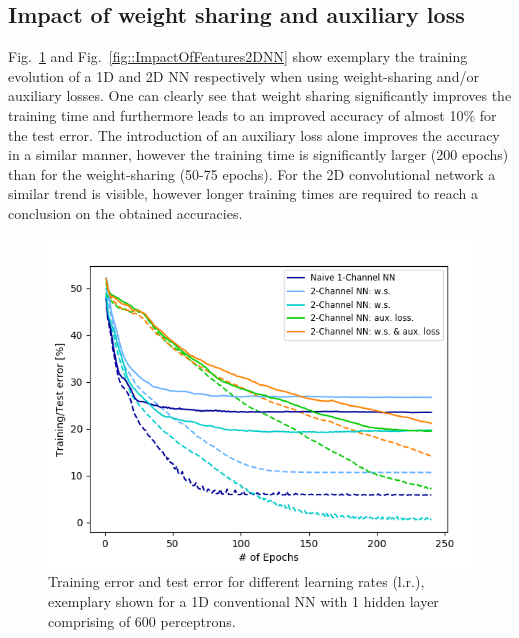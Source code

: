 \documentclass[a4paper, 12pt, conference]{article}
\begin{document}
\subsection{Impact of weight sharing and auxiliary loss}
Fig.~\ref{fig::ImpactOfFeatures1DNN} and Fig.~\ref{fig::ImpactOfFeatures2DNN} show exemplary the training evolution of a 1D and 2D NN respectively when using weight-sharing and/or auxiliary losses. One can clearly see that weight sharing significantly improves the training time and furthermore leads to an improved accuracy of almost 10\% for the test error. The introduction of an auxiliary loss alone improves the accuracy in a similar manner, however the training time is significantly larger (200 epochs) than for the weight-sharing (50-75 epochs). For the 2D convolutional network a similar trend is visible, however longer training times are required to reach a conclusion on the obtained accuracies. 
\begin{figure}[H]
	\centering
  \includegraphics[scale=0.5]{ImpactOfFeatures1DNN.png}
  \caption{Training error and test error for different learning rates (l.r.), exemplary shown for a 1D conventional NN with 1 hidden layer comprising of 600 perceptrons.}
  \label{fig::ImpactOfFeatures1DNN}
\end{figure}
\end{document}
